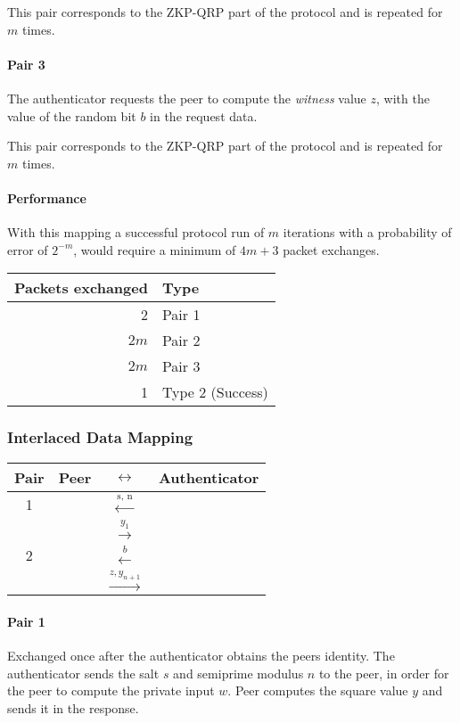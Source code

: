 This pair corresponds to the ZKP-QRP part of the protocol and is repeated for $m$ times. %

\paragraph{Pair 3} The authenticator requests the peer to compute the \textit{witness} value $z$, with the value of the random bit $b$ in the request data.

This pair corresponds to the ZKP-QRP part of the protocol and is repeated for $m$ times.

\paragraph{Performance}
With this mapping a successful protocol run of $m$ iterations with a probability of error of $2^{-m}$, would require a minimum of $4m + 3$ packet exchanges.

\bigskip

\begin{center}
	\begin{tabular}{r|l}
		Packets exchanged & Type\\
		\hline
		2 & Pair 1\\
		$2m$ & Pair 2\\
		$2m$ & Pair 3\\
		1 & Type 2 (Success)\\
	\end{tabular}
\end{center}

\subsubsection{Interlaced Data Mapping}

\begin{center}
	\begin{tabular}{c|rcl}
	Pair & Peer  & $\leftrightarrow$ & Authenticator \\
	\hline
	1 & & $\xleftarrow{\text{s, n}}$ &\\
	&& $\xrightarrow{y_1}$&\\
	\hline
	2 & & $\xleftarrow{b}$&\\
	&& $\xrightarrow{z, y_{n+1}}$&\\
	\hline
	\end{tabular}
\end{center}

\paragraph{Pair 1} Exchanged once after the authenticator obtains the peers identity. 
The authenticator sends the salt $s$ and semiprime modulus $n$ to the peer, in order for the peer to compute the private input $w$.
Peer computes the square value $y$ and sends it in the response.

